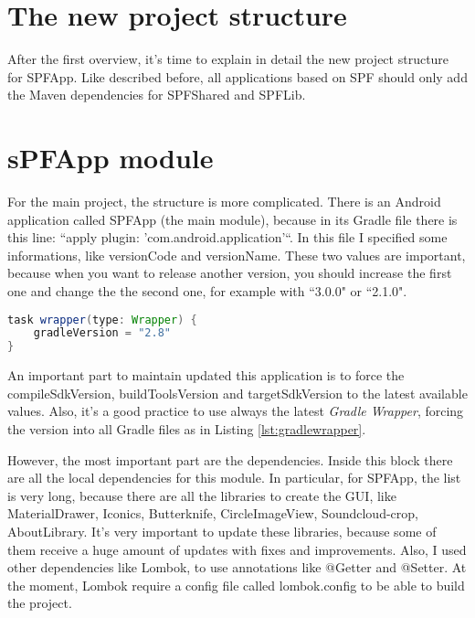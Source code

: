 \section{The new project structure}
After the first overview, it's time to explain in detail the new project structure for \textsf{SPFApp}. Like described before, all applications based on SPF should only add the Maven dependencies for \textsf{SPFShared} and \textsf{SPFLib}.

\section*{sPFApp module}

For the main project, the structure is more complicated.
There is an Android application called \textsf{SPFApp} (the main module), because in its Gradle file there is this line: ``apply plugin: 'com.android.application'``.
In this file I specified some informations, like \textsf{versionCode} and \textsf{versionName}. These two values are important, because when you want to release another version, you should increase the first one and change the the second one, for example with ``3.0.0" or ``2.1.0".

\begin{lstlisting}[caption={Gradle wapper},label=lst:gradlewrapper, language=Java]
task wrapper(type: Wrapper) {
    gradleVersion = "2.8"
}
\end{lstlisting}

An important part to maintain updated this application is to force the \textsf{compileSdkVersion}, \textsf{buildToolsVersion} and \textsf{targetSdkVersion} to the latest available values. Also, it's a good practice to use always the latest \emph{Gradle Wrapper}, forcing the version into all Gradle files as in Listing \ref{lst:gradlewrapper}.

However, the most important part are the dependencies.
Inside this block there are all the local dependencies for this module. In particular, for SPFApp, the list is very long, because there are all the libraries to create the GUI, like \textsf{MaterialDrawer}, \textsf{Iconics}, \textsf{Butterknife}, \textsf{CircleImageView}, \textsf{Soundcloud-crop}, \textsf{AboutLibrary}.
It's very important to update these libraries, because some of them receive a huge amount of updates with fixes and improvements. Also, I used other dependencies like Lombok, to use annotations like @Getter and @Setter. At the moment, Lombok require a config file called \textsf{lombok.config} to be able to build the project.

